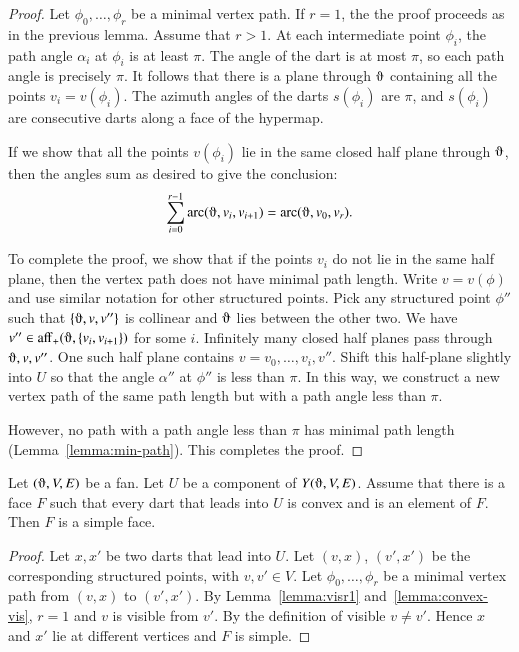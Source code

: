 \begin{proof}  Let $\phi_0,\ldots,\phi_r$ be a minimal vertex path.
If $r=1$, the the proof proceeds as in the previous lemma. Assume that $r>1$.
At each intermediate point $\phi_i$, 
the path angle $\alpha_i$ at $\phi_i$ is at least $\pi$.  The angle of the dart is at most $\pi$, so each path angle is precisely $\pi$.  It follows that there is a plane through $\orgn$ containing all the points $v_i=v(\phi_i)$.  The azimuth angles of the darts $s(\phi_i)$ are $\pi$, and
$s(\phi_i)$ are consecutive darts along a face of the hypermap.

If we show that all the points $v(\phi_i)$ lie in the same closed half plane through $\orgn$, then the angles sum as desired to give the conclusion:
  $$
  \sum_{i=0}^{r-1}\arc(\orgn,v_i,v_{i+1}) = \arc(\orgn,v_0,v_r).
  $$

To complete the proof, we show that if the points $v_i$
do not lie in the same half plane, then the vertex path does not have minimal path length.  
Write $v=v(\phi)$ and use
similar notation for other structured points.
Pick any structured point $\phi''$ such that
$\{\orgn,v,v''\}$ 
is collinear and $\orgn$ lies between the other two.  
We have $v''\in \op{aff}_+(\orgn,\{v_i,v_{i+1}\})$ for some $i$.
Infinitely many closed half planes pass through $\orgn,v,v''$.  One such half
plane contains $v=v_0,\ldots,v_i,v''$.  Shift this half-plane slightly
into $U$ so that the angle $\alpha''$ at $\phi''$ is less than $\pi$.
In this way, we construct a new vertex path
of the same path length but with a path angle less than $\pi$.

However, no path with a path angle less than $\pi$ has minimal path length (Lemma~\ref{lemma:min-path}).
This completes the proof.
\end{proof}

\begin{lemma}
Let $(\orgn,V,E)$ be a fan.  Let $U$ be a component
of $Y(\orgn,V,E)$.  Assume that there is a face $F$ such that every
dart that leads into $U$ is convex and is an element of $F$.  Then
$F$ is a simple face.
\end{lemma}

\begin{proof} Let $x,x'$ be two darts that lead into $U$.  Let
$(v,x)$, $(v',x')$ be the corresponding structured points, with $v,v'\in V$.
Let $\phi_0,\ldots,\phi_r$ be a minimal vertex path from $(v,x)$ to 
$(v',x')$.  By Lemma~\ref{lemma:visr1}  and~\ref{lemma:convex-vis}, 
$r=1$ and $v$ is visible from $v'$.  By the definition of visible
$v\ne v'$.  Hence $x$ and $x'$ lie at different vertices and $F$ is simple.
\end{proof}

